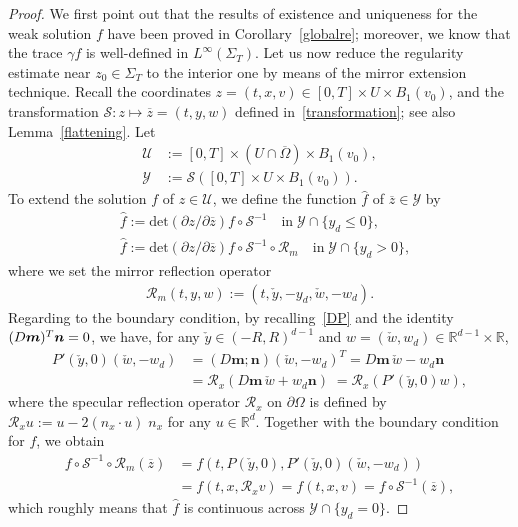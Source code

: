 \documentclass[10pt]{amsart}
\theoremstyle{definition}\newtheorem{defi}[theo]{Definition}\newtheorem{rema}[theo]{Remark}\newtheorem{exam}[theo]{Example}\newtheorem{exem}[theo]{Example}\newtheorem{nota}[theo]{Notation}
\newcommand*\p{\partial}
\renewcommand*\det{\mathrm{det}}
\newcommand*\Rm {\mathcal{R}_m}
\newcommand*\R {\mathbb{R}}
\renewcommand*\SS {\mathcal{S}}
\newcommand*\RR {\mathcal{R}}
\newcommand*\U {\mathcal{U}}
\newcommand*\Y {\mathcal{Y}}
\newcommand*\mm {\boldsymbol{m}}
\newcommand*\nn {\boldsymbol{n}}
\begin{document}
\begin{proof}
We first point out that the results of existence and uniqueness for the weak solution $f$ have been proved in Corollary~\ref{globalre}; moreover, we know that the trace $\gamma f$ is well-defined in $L^\infty(\Sigma_T)$. Let us now reduce the regularity estimate near $z_0\in\Sigma_T$ to the interior one by means of the mirror extension technique. Recall the coordinates $z=(t,x,v)\in[0,T]\times U\times B_1(v_0)$, and the transformation $\SS:z\mapsto\overline{z}=(t,y,w)$ defined in~\eqref{transformation}; see also Lemma~\ref{flattening}. Let
\begin{align*}
\U&:=[0,T]\times (U\cap\overline{\Omega})\times B_1(v_0),\\
\Y&:=\SS\left([0,T]\times U\times B_1(v_0)\right).
\end{align*}
To extend the solution $f$ of $z\in\U$, we define the function $\widehat{f}$ of $\overline{z}\in\Y$ by
\begin{align*}
&\widehat{f}:=\det\!\left({\p z}/{\p\overline{z}}\right) f\circ\SS^{-1} \quad\text{in}\;\Y\cap\{y_d\le0\},\\
&\widehat{f}:=\det\!\left({\p z}/{\p\overline{z}}\right) f\circ\SS^{-1}\!\circ\Rm \quad\text{in}\;\Y\cap\{y_d>0\},
\end{align*}
where we set the mirror reflection operator
\begin{align*}
\Rm(t,y,w):=\left(t,\check{y},-y_d,\check{w},-w_d\right).
\end{align*}
Regarding to the boundary condition, by recalling~\eqref{DP} and the identity $(D\mm)^T\nn\linebreak=0$, we have, for any $\check{y}\in(-R,R)^{d-1}$ and $w=(\check{w},w_d)\in \R^{d-1}\times\R$,
\begin{align*}
P'(\check{y},0)(\check{w},-w_d)&= (D\mm;\nn)(\check{w},-w_d)^T = D\mm\,\check{w}-w_d\nn\\
&=\RR_x(D\mm\,\check{w}+w_d\nn)\; = \RR_x(P'(\check{y},0)w),
\end{align*}
where the specular reflection operator $\RR_x$ on $\p\Omega$ is defined by $\RR_xu:=u-2(n_x\cdot u)\;\!n_x$ for any $u\in\R^d$. Together with the boundary condition for $f$, we obtain
\begin{equation}\label{reflection}
\begin{split}
f\circ\SS^{-1}\!\circ\Rm(\overline{z}) &=f\left(t,P(\check{y},0),P'(\check{y},0)(\check{w},-w_d)\right)\\
&=f(t,x,\RR_x v)=f\left(t,x,v\right)=f\circ\SS^{-1}(\overline{z}),
\end{split}
\end{equation}
which roughly means that $\widehat{f}$ is continuous across $\Y\cap\{y_d=0\}$.


\end{proof}
\end{document}
